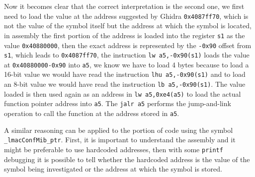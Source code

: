 
Now it becomes clear that the correct interpretation is the second one,
we first need to load the value at the address suggested by Ghidra \texttt{0x4087ff70},
which is not the value of the symbol itself but the address at which the symbol is located,
in assembly the first portion of the address is loaded into the register \texttt{s1} as
the value \texttt{0x40880000}, then the exact address is represented by
the \texttt{-0x90} offset from \texttt{s1}, which leads to \texttt{0x4087ff70},
the instruction \texttt{lw a5,-0x90(s1)} loads the value at \texttt{0x40880000-0x90} into \texttt{a5},
we know we have to load 4 bytes because to load a 16-bit value we would have read the instruction
\texttt{lhu a5,-0x90(s1)} and to load an 8-bit value we would have read the instruction
\texttt{lb a5,-0x90(s1)}. 
The value loaded is then used again as an address in \texttt{lw a5,0xe4(a5)} to load
the actual function pointer address into \texttt{a5}. 
The \texttt{jalr a5} performs the jump-and-link operation to call the function at the address
stored in \texttt{a5}.

A similar reasoning can be applied to the portion of code using the symbol \texttt{\_lmacConfMib\_ptr}.
First, it is important to understand the assembly and it might be preferable to use hardcoded addresses,
then with some \texttt{printf} debugging it is possible to tell whether the hardcoded address
is the value of the symbol being investigated or the address at which the symbol is stored.

